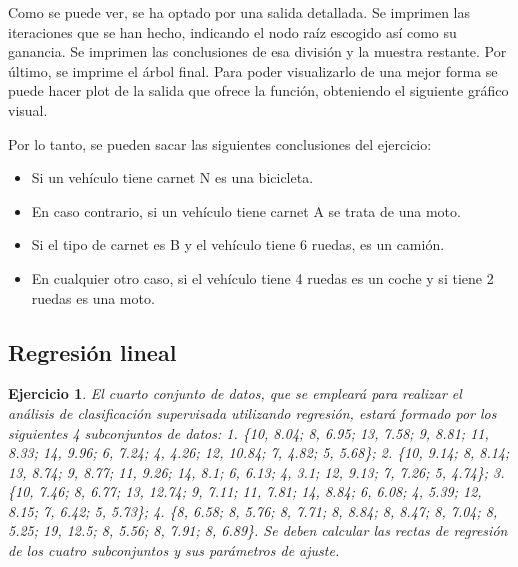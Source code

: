\documentclass[12pt]{report}\usepackage[]{graphicx}\usepackage[dvipsnames]{xcolor}
\makeatletter
\newenvironment{kframe}{%
 \def\at@end@of@kframe{}%
 \ifinner\ifhmode%
  \def\at@end@of@kframe{\end{minipage}}%
  \begin{minipage}{\columnwidth}%
 \fi\fi%
 \def\FrameCommand##1{\hskip\@totalleftmargin \hskip-\fboxsep
 \colorbox{shadecolor}{##1}\hskip-\fboxsep
     \hskip-\linewidth \hskip-\@totalleftmargin \hskip\columnwidth}%
 \MakeFramed {\advance\hsize-\width
   \@totalleftmargin\z@ \linewidth\hsize
   \@setminipage}}%
 {\par\unskip\endMakeFramed%
 \at@end@of@kframe}
\newenvironment{knitrout}{}{} %
\newtheorem{exercise}{Ejercicio}[section]
\makeatother
\begin{document}
 			Como se puede ver, se ha optado por una salida detallada. Se imprimen las iteraciones que se han hecho, indicando el nodo raíz escogido así como su ganancia. Se imprimen las conclusiones de esa división y la muestra restante. Por último, se imprime el árbol final. Para poder visualizarlo de una mejor forma se puede hacer plot de la salida que ofrece la función, obteniendo el siguiente gráfico visual.
 			
\begin{knitrout}
\color{fgcolor}\begin{kframe}


{\ttfamily\noindent\bfseries\color{errorcolor}{\#\# Error in loadNamespace(name): there is no package called 'webshot'}}\end{kframe}
\end{knitrout}
 			
 			Por lo tanto, se pueden sacar las siguientes conclusiones del ejercicio:
 			
 			\begin{itemize}
 				\item Si un vehículo tiene carnet N es una bicicleta.
 				\item En caso contrario, si un vehículo tiene carnet A se trata de una moto.
 				\item Si el tipo de carnet es B y el vehículo tiene 6 ruedas, es un camión.
 				\item En cualquier otro caso, si el vehículo tiene 4 ruedas es un coche y si tiene 2 ruedas es una moto.
 			\end{itemize}				
 			
 			\subsection{Regresión lineal}
 			
 				\begin{exercise}
 					El cuarto conjunto de datos, que se empleará para realizar el análisis de clasificación supervisada utilizando regresión, estará formado por los siguientes 4 subconjuntos de datos: 1. \{10, 8.04; 8, 6.95; 13, 7.58; 9, 8.81; 11, 8.33; 14, 9.96; 6, 7.24; 4, 4.26; 12, 10.84; 7, 4.82; 5, 5.68\}; 2. \{10, 9.14; 8, 8.14; 13, 8.74; 9, 8.77; 11, 9.26; 14, 8.1; 6, 6.13; 4, 3.1; 12, 9.13; 7, 7.26; 5, 4.74\}; 3. \{10, 7.46; 8, 6.77; 13, 12.74; 9, 7.11; 11, 7.81; 14, 8.84; 6, 6.08; 4, 5.39; 12, 8.15; 7, 6.42; 5, 5.73\}; 4. \{8, 6.58; 8, 5.76; 8, 7.71; 8, 8.84; 8, 8.47; 8, 7.04; 8, 5.25; 19, 12.5; 8, 5.56; 8, 7.91; 8, 6.89\}. Se deben calcular las rectas de regresión de los cuatro subconjuntos y sus parámetros de ajuste.
 				\end{exercise}
 				
\end{document}
